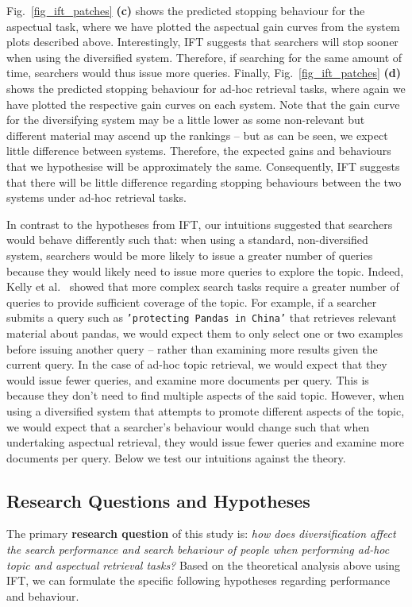 Fig.~\ref{fig_ift_patches} \textbf{(c)} shows the predicted stopping behaviour for the aspectual task, where we have plotted the aspectual gain curves from the system plots described above. Interestingly, IFT suggests that searchers will stop sooner when using the diversified system. Therefore, if searching for the same amount of time, searchers would thus issue more queries. Finally, Fig.~\ref{fig_ift_patches} \textbf{(d)} shows the predicted stopping behaviour for ad-hoc retrieval tasks, where again we have plotted the respective gain curves on each system. Note that the gain curve for the diversifying system may be a little lower as some non-relevant but different material may ascend up the rankings -- but as can be seen, we expect little difference between systems. Therefore, the expected gains and behaviours that we hypothesise will be approximately the same. Consequently, IFT suggests that there will be little difference regarding stopping behaviours between the two systems under ad-hoc retrieval tasks.

In contrast to the hypotheses from IFT, our intuitions suggested that searchers would behave differently such that: when using a standard, non-diversified system, searchers would be more likely to issue a greater number of queries because they would likely need to issue more queries to explore the topic. Indeed, Kelly et al.~\cite{kelly2015search_tasks} showed that more complex search tasks require a greater number of queries to provide sufficient coverage of the topic. For example, if a searcher submits a query such as \texttt{'protecting Pandas in China'} that retrieves relevant material about pandas, we would expect them to only select one or two examples before issuing another query -- rather than examining more results given the current query. In the case of ad-hoc topic retrieval, we would expect that they would issue fewer queries, and examine more documents per query. This is because they don't need to find multiple aspects of the said topic. However, when using a diversified system that attempts to promote different aspects of the topic, we would expect that a searcher's behaviour would change such that when undertaking aspectual retrieval, they would issue fewer queries and examine more documents per query. Below we test our intuitions against the theory.

\subsection{Research Questions and Hypotheses} \label{sec:questions}
The primary \textbf{research question} of this study is: {\it how does diversification affect the search performance and search behaviour of people when performing ad-hoc topic and aspectual retrieval tasks?} Based on the theoretical analysis above using IFT, we can formulate the specific following hypotheses regarding performance and behaviour.

